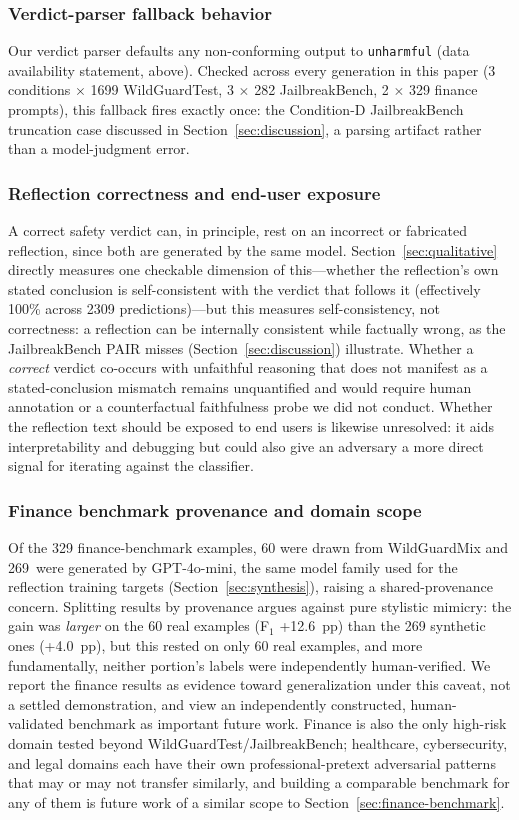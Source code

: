 \documentclass[superintelligence,article,accept,moreauthors]{Definitions/mdpi}
\begin{document}
\subsubsection{Verdict-parser fallback behavior}
Our verdict parser defaults any non-conforming output to \texttt{unharmful} (data availability statement, above). Checked across every generation in this paper (3 conditions $\times$ 1699 WildGuardTest, 3 $\times$ 282 JailbreakBench, 2 $\times$ 329 finance prompts), this fallback fires exactly once: the Condition-D JailbreakBench truncation case discussed in Section~\ref{sec:discussion}, a parsing artifact rather than a model-judgment error.

\subsubsection{Reflection correctness and end-user exposure}
A correct safety verdict can, in principle, rest on an incorrect or fabricated reflection, since both are generated by the same model. Section~\ref{sec:qualitative} directly measures one checkable dimension of this---whether the reflection's own stated conclusion is self-consistent with the verdict that follows it (effectively 100\% across 2309 predictions)---but this measures self-consistency, not correctness: a reflection can be internally consistent while factually wrong, as the JailbreakBench PAIR misses (Section~\ref{sec:discussion}) illustrate. Whether a \emph{correct} verdict co-occurs with unfaithful reasoning that does not manifest as a stated-conclusion mismatch remains unquantified and would require human annotation or a counterfactual faithfulness probe we did not conduct. Whether the reflection text should be exposed to end users is likewise unresolved: it aids interpretability and debugging but could also give an adversary a more direct signal for iterating against the classifier.

\subsubsection{Finance benchmark provenance and domain scope}
Of the 329 finance-benchmark examples, 60 were drawn from WildGuardMix and 269~were generated by GPT-4o-mini, the same model family used for the reflection training targets (Section~\ref{sec:synthesis}), raising a shared-provenance concern. Splitting results by provenance argues against pure stylistic mimicry: the gain was \emph{larger} on the 60 real examples (F$_1$ +12.6~pp) than the 269 synthetic ones (+4.0~pp), but this rested on only 60 real examples, and more fundamentally, neither portion's labels were independently human-verified. We report the finance results as evidence toward generalization under this caveat, not a settled demonstration, and view an independently constructed, human-validated benchmark as important future work. Finance is also the only high-risk domain tested beyond WildGuardTest/JailbreakBench; healthcare, cybersecurity, and legal domains each have their own professional-pretext adversarial patterns that may or may not transfer similarly, and building a comparable benchmark for any of them is future work of a similar scope to Section~\ref{sec:finance-benchmark}.
\end{document}
